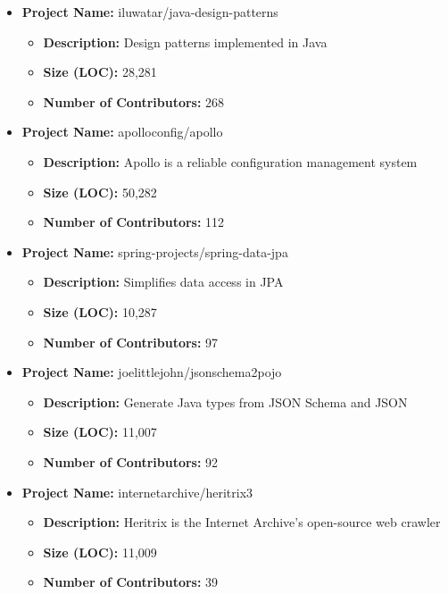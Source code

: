 \documentclass[conference]{IEEEtran}
\begin{document}
        \begin{itemize}
            \item \textbf{Project Name:} iluwatar/java-design-patterns
            \begin{itemize}
                \item \textbf{Description:} Design patterns implemented in Java
                \item \textbf{Size (LOC):} 28,281
                \item \textbf{Number of Contributors:} 268
            \end{itemize}
        
            \item \textbf{Project Name:} apolloconfig/apollo
            \begin{itemize}
                \item \textbf{Description:} Apollo is a reliable configuration management system
                \item \textbf{Size (LOC):} 50,282
                \item \textbf{Number of Contributors:} 112
            \end{itemize}
        
            \item \textbf{Project Name:} spring-projects/spring-data-jpa
            \begin{itemize}
                \item \textbf{Description:} Simplifies data access in JPA
                \item \textbf{Size (LOC):} 10,287
                \item \textbf{Number of Contributors:} 97
            \end{itemize}
        
            \item \textbf{Project Name:} joelittlejohn/jsonschema2pojo
            \begin{itemize}
                \item \textbf{Description:} Generate Java types from JSON Schema and JSON
                \item \textbf{Size (LOC):} 11,007
                \item \textbf{Number of Contributors:} 92
            \end{itemize}
        
            \item \textbf{Project Name:} internetarchive/heritrix3
            \begin{itemize}
                \item \textbf{Description:} Heritrix is the Internet Archive's open-source web crawler
                \item \textbf{Size (LOC):} 11,009
                \item \textbf{Number of Contributors:} 39
            \end{itemize}
        

\end{itemize}
\end{document}
